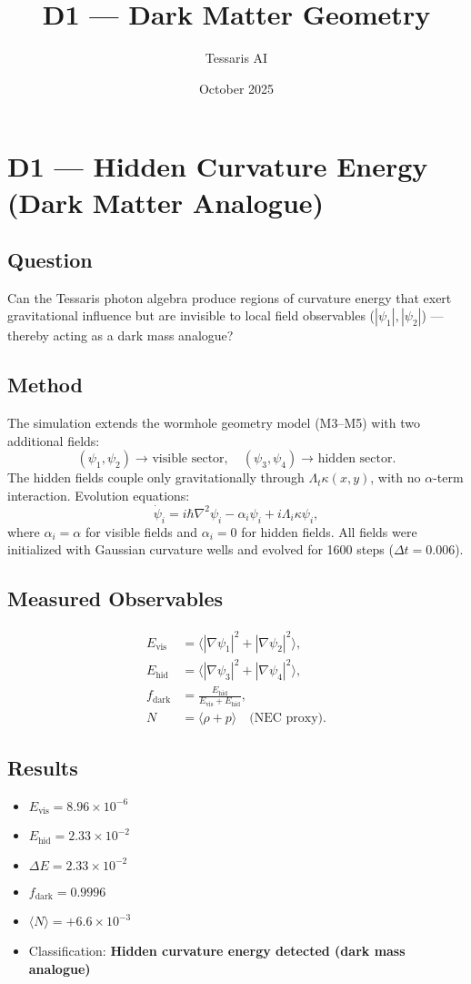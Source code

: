 \documentclass{article}
\title{D1 — Dark Matter Geometry}
\author{Tessaris AI}
\date{October 2025}
\begin{document}
\maketitle

\section*{D1 — Hidden Curvature Energy (Dark Matter Analogue)}

\subsection*{Question}
Can the Tessaris photon algebra produce regions of curvature energy that exert gravitational influence but are invisible to local field observables (\(|\psi_1|, |\psi_2|\)) — thereby acting as a dark mass analogue?

\subsection*{Method}
The simulation extends the wormhole geometry model (M3–M5) with two additional fields:
\[
(\psi_1, \psi_2) \; \text{→ visible sector}, \quad
(\psi_3, \psi_4) \; \text{→ hidden sector}.
\]
The hidden fields couple only gravitationally through \(\Lambda_t \kappa(x,y)\), with no \(\alpha\)-term interaction.  
Evolution equations:
\[
\dot{\psi}_i = i\hbar\nabla^2\psi_i - \alpha_i \psi_i + i\Lambda_i \kappa \psi_i ,
\]
where \(\alpha_i = \alpha\) for visible fields and \(\alpha_i = 0\) for hidden fields.  
All fields were initialized with Gaussian curvature wells and evolved for 1600 steps (\(\Delta t = 0.006\)).

\subsection*{Measured Observables}
\begin{align*}
E_{\text{vis}} &= \langle |\nabla \psi_1|^2 + |\nabla \psi_2|^2 \rangle, \\
E_{\text{hid}} &= \langle |\nabla \psi_3|^2 + |\nabla \psi_4|^2 \rangle, \\
f_{\text{dark}} &= \frac{E_{\text{hid}}}{E_{\text{vis}} + E_{\text{hid}}}, \\
N &= \langle \rho + p \rangle \quad \text{(NEC proxy)} .
\end{align*}

\subsection*{Results}
\begin{itemize}
  \item \(E_{\text{vis}} = 8.96\times10^{-6}\)
  \item \(E_{\text{hid}} = 2.33\times10^{-2}\)
  \item \(\Delta E = 2.33\times10^{-2}\)
  \item \(f_{\text{dark}} = 0.9996\)
  \item \(\langle N \rangle = +6.6\times10^{-3}\)
  \item Classification: \textbf{Hidden curvature energy detected (dark mass analogue)}
\end{itemize}
\end{document}
